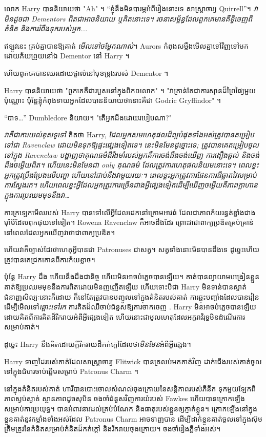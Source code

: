 {លោក Harry បាននិយាយថា "Ah" ។ “ខ្ញុំ​នឹង​មិន​បារម្ភ​អំពី​រឿង​នោះ​ទេ សាស្ត្រាចារ្យ Quirrell”។ \emph{វាមិនដូចជា Dementors ពិតជាអាចនិយាយ ឬគិតនោះទេ។ រចនាសម្ព័ន្ធដែលពួកគេមានគឺខ្ចីចេញពីគំនិត និងការរំពឹងទុករបស់អ្នក...}

ឥឡូវនេះ គ្រប់គ្នាបានឱ្យគាត់ \emph{មើលទៅចម្លែកណាស់}។ Aurors កំពុងសម្លឹងមើលគ្នាទៅវិញទៅមកដោយភ័យព្រួយនៅឯ Dementor នៅ Harry ។

ហើយពួកគេបានឈរដោយផ្ទាល់នៅមុខទ្រុងរបស់ Dementor ។

Harry បាននិយាយថា "ពួកគេគឺជារបួសនៅក្នុងពិភពលោក" ។ "វាគ្រាន់តែជាការស្មានដ៏ព្រៃផ្សៃមួយប៉ុណ្ណោះ ប៉ុន្តែខ្ញុំកំពុងទាយអ្នកដែលបាននិយាយថានោះគឺជា Godric Gryffindor" ។

“បាទ…” Dumbledore និយាយ។ "តើអ្នកដឹងដោយរបៀបណា?"

\emph{វាគឺជាការយល់ខុសទូទៅ} គិតថា Harry, \emph{ដែលអ្នកសមហេតុផលដ៏ល្អបំផុតទាំងអស់ត្រូវបានតម្រៀបទៅជា Ravenclaw ដោយមិនទុកឱ្យផ្ទះផ្សេងទៀតទេ។ នេះមិនមែនដូច្នោះទេ; ត្រូវបានគេតម្រៀបចូលទៅក្នុង Ravenclaw បង្ហាញថាគុណធម៌ដ៏រឹងមាំរបស់អ្នកគឺការចង់ដឹងចង់ឃើញ ការងឿងឆ្ងល់ និងចង់ដឹងចម្លើយពិត។ ហើយនេះមិនមែនជា \emph{only} គុណធម៌ ដែលត្រូវការហេតុផលនិយមនោះទេ។ ពេល​ខ្លះ​អ្នក​ត្រូវ​ប្រឹងប្រែង​លើ​បញ្ហា ហើយ​នៅ​ជាប់​នឹង​វា​មួយ​រយៈ។ ពេលខ្លះអ្នកត្រូវការផែនការដ៏ឆ្លាតវៃសម្រាប់ការស្វែងរក។ ហើយពេលខ្លះអ្វីដែលអ្នកត្រូវការច្រើនជាងអ្វីផ្សេងទៀតដើម្បីឃើញចម្លើយគឺភាពក្លាហានក្នុងការប្រឈមមុខនឹងវា…}

ការក្រឡេកមើលរបស់ Harry បានទៅលើអ្វីដែលដេកនៅក្រោមអាវធំ ដែលជាភាពភ័យរន្ធត់ខ្លាំងជាងម៉ាំមីដែលពុកផុយទៅទៀត។ Rowena Ravenclaw ក៏អាចដឹងដែរ ព្រោះវាជាពាក្យប្រឌិតគ្រប់គ្រាន់ នៅពេលដែលអ្នកឃើញវាថាជាពាក្យប្រឌិត។

ហើយវាក៏ច្បាស់ដែរថាហេតុអ្វីបានជា Patronuses ជាសត្វ។ សត្វ​ទាំង​នោះ​មិន​បាន​ដឹង​ទេ ដូច្នេះ​ហើយ​ត្រូវ​បាន​គេ​ជ្រកកោន​ពី​ការ​ភ័យ​ខ្លាច។

ប៉ុន្តែ Harry ដឹង ហើយនឹងដឹងជានិច្ច ហើយមិនអាចបំភ្លេចបានឡើយ។ គាត់បានព្យាយាមបង្រៀនខ្លួនគាត់ឱ្យប្រឈមមុខនឹងការពិតដោយមិនញញើតឡើយ ហើយទោះបីជា Harry មិនទាន់បានស្ទាត់ជំនាញសិល្បៈនោះក៏ដោយ ក៏នៅតែត្រូវបានបញ្ចូលទៅក្នុងគំនិតរបស់គាត់ ការឆ្លុះបញ្ចាំងដែលបានរៀនដើម្បីមើលទៅ\emph{ឆ្ពោះទៅរក} ការគិតដ៏ឈឺចាប់ជំនួសឱ្យការចាកចេញ . Harry មិនអាចបំភ្លេចបានឡើយ ដោយគិតពីការគិតដ៏រីករាយអំពីអ្វីផ្សេងទៀត ហើយនោះជាមូលហេតុដែលអក្ខរាវិរុទ្ធមិនដំណើរការសម្រាប់គាត់។

ដូច្នេះ Harry នឹងគិតដោយក្តីរីករាយដ៏កក់ក្តៅដែលថា\emph{មិនមែន}អំពីអ្វីផ្សេង។

Harry ទាញដៃរបស់គាត់ដែលសាស្រ្តាចារ្យ Flitwick បានត្រលប់មកគាត់វិញ ដាក់ជើងរបស់គាត់ចូលទៅក្នុងជំហរចាប់ផ្តើមសម្រាប់ Patronus Charm ។

នៅក្នុងគំនិតរបស់គាត់ ហារីបានបោះចោលសំណល់ចុងក្រោយនៃសន្តិភាពរបស់ភីនីក ទុកមួយឡែកពីភាពស្ងប់ស្ងាត់ ស្ថានភាពដូចសុបិន ចងចាំជំនួសវិញការយំរបស់ Fawkes ហើយបានក្រោកឡើងសម្រាប់ការប្រយុទ្ធ។ បាន​អំពាវនាវ​ដល់​គ្រប់​បំណែក និង​ធាតុ​របស់​ខ្លួន​ឲ្យ​ភ្ញាក់​ខ្លួន។ ក្រោកឡើងនៅក្នុងខ្លួនគាត់នូវកម្លាំងទាំងអស់ដែល Patronus Charm អាចទាញបាន ដើម្បីដាក់ខ្លួនគាត់ចូលទៅក្នុងស៊ុមត្រឹមត្រូវនៃគំនិតសម្រាប់គំនិតដ៏កក់ក្តៅ និងរីករាយចុងក្រោយ។ ចងចាំរឿងភ្លឺទាំងអស់។

}
